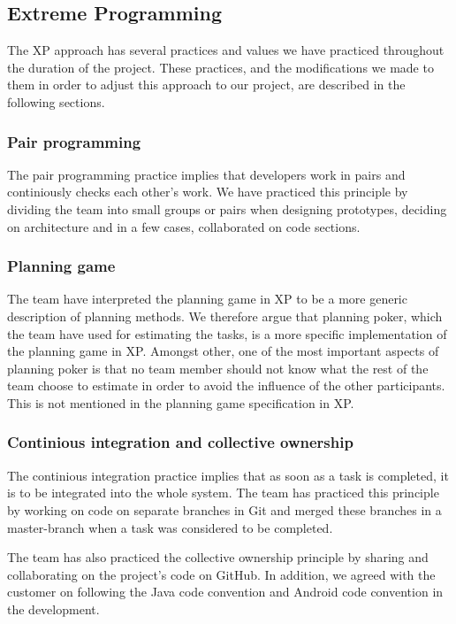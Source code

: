 \subsection{Extreme Programming}
The XP approach has several practices and values we have practiced throughout the duration of the project. These practices, and the modifications we made to them in order to adjust this approach to our project, are described in the following sections.

\subsubsection{Pair programming}
The pair programming practice implies that developers work in pairs and continiously checks each other's work. We have practiced this principle by dividing the team into small groups or pairs when designing prototypes, deciding on architecture and in a few cases, collaborated on code sections.


\subsubsection{Planning game}
The team have interpreted the planning game in XP to be a more generic description of planning methods. We therefore argue that planning poker, which the team have used for estimating the tasks, is a more specific implementation of the planning game in XP. Amongst other, one of the most important aspects of planning poker is that no team member should not know what the rest of the team choose to estimate in order to avoid the influence of the other participants. This is not mentioned in the planning game specification in XP.

\subsubsection{Continious integration and collective ownership}
The continious integration practice implies that as soon as a task is completed, it is to be integrated into the whole system. The team has practiced this principle by working on code on separate branches in Git and merged these branches in a master-branch when a task was considered to be completed.

The team has also practiced the collective ownership principle by sharing and collaborating on the project's code on GitHub. In addition, we agreed with the customer on following the Java code convention and Android code convention in the development.

